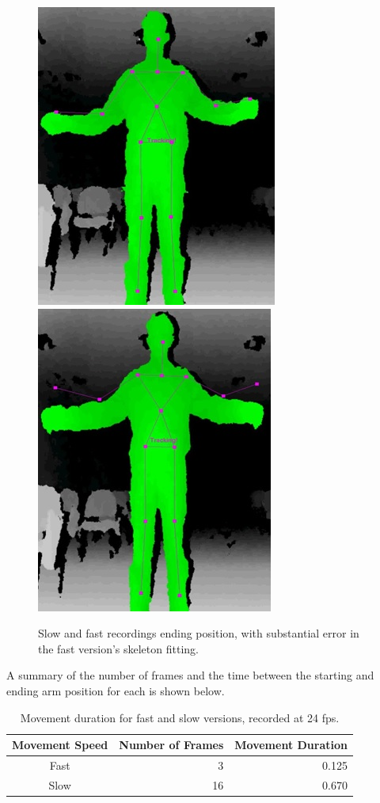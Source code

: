 \documentclass[11pt,a4paper]{article}
\begin{document}
\begin{figure}[H]
\center
\includegraphics[scale=0.5]{SlowEnd.jpg} \includegraphics[scale=0.4925]{FastEnd.jpg}
\caption{Slow and fast recordings ending position, with substantial error in the fast version's skeleton fitting.}
\end{figure}


\noindent A summary of the number of frames and the time between the starting and ending arm position for each  is shown below.

\begin{table}[H]
\center
\begin{tabular}{| c | r | r |}
\hline
Movement Speed & Number of Frames & Movement Duration\\
\hline
Fast & 3 & 0.125\\
Slow & 16 & 0.670\\
\hline
\end{tabular}
\caption{Movement duration for fast and slow versions, recorded at 24 fps.}
\end{table}
\end{document}
